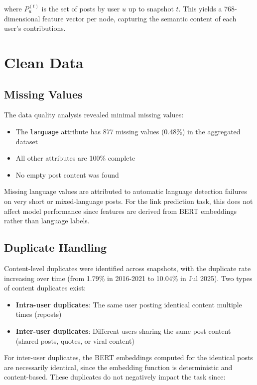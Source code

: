 where $P_u^{(t)}$ is the set of posts by user $u$ up to snapshot $t$. This yields a 768-dimensional feature vector per node, capturing the semantic content of each user's contributions.

\section{Clean Data}

\subsection*{Missing Values}

The data quality analysis revealed minimal missing values:

\begin{itemize}
	\item The \texttt{language} attribute has 877 missing values (0.48\%) in the aggregated dataset
	\item All other attributes are 100\% complete
	\item No empty post content was found
\end{itemize}

Missing language values are attributed to automatic language detection failures on very short or mixed-language posts. For the link prediction task, this does not affect model performance since features are derived from BERT embeddings rather than language labels.

\subsection*{Duplicate Handling}

Content-level duplicates were identified across snapshots, with the duplicate rate increasing over time (from 1.79\% in 2016-2021 to 10.04\% in Jul 2025). Two types of content duplicates exist:

\begin{itemize}
	\item \textbf{Intra-user duplicates}: The same user posting identical content multiple times (reposts)
	\item \textbf{Inter-user duplicates}: Different users sharing the same post content (shared posts, quotes, or viral content)
\end{itemize}

For inter-user duplicates, the BERT embeddings computed for the identical posts are necessarily identical, since the embedding function is deterministic and content-based. These duplicates do not negatively impact the task since:

